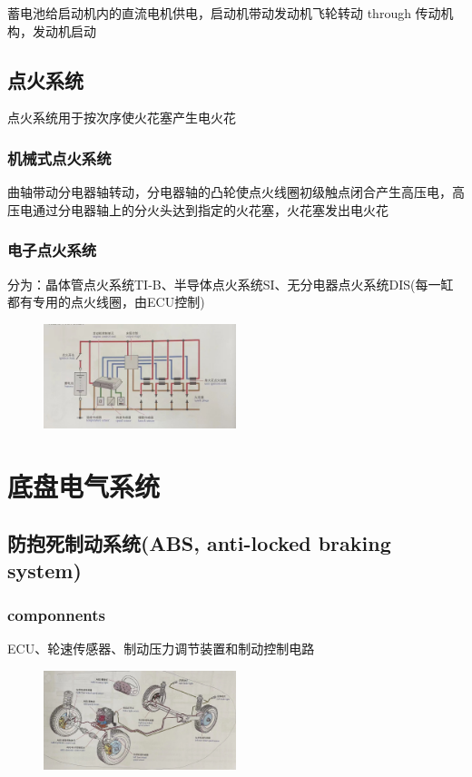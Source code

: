	
	蓄电池给启动机内的直流电机供电，启动机带动发动机飞轮转动 through 传动机构，发动机启动
\subsection{点火系统}
	点火系统用于按次序使火花塞产生电火花
	\subsubsection{机械式点火系统}
		曲轴带动分电器轴转动，分电器轴的凸轮使点火线圈初级触点闭合产生高压电，高压电通过分电器轴上的分火头达到指定的火花塞，火花塞发出电火花
	\subsubsection{电子点火系统}
		分为：晶体管点火系统TI-B、半导体点火系统SI、无分电器点火系统DIS(每一缸都有专用的点火线圈，由ECU控制)
		\begin{figure}[htbp]
			\centering
			\includegraphics[width=0.5\textwidth]{5-3}
		\end{figure}

\section{底盘电气系统}
\subsection{防抱死制动系统(ABS, anti-locked braking system)}
	\subsubsection{componnents}
		ECU、轮速传感器、制动压力调节装置和制动控制电路
		\begin{figure}[htbp]
			\centering
			\includegraphics[width=0.5\textwidth]{5-4}
		\end{figure}
